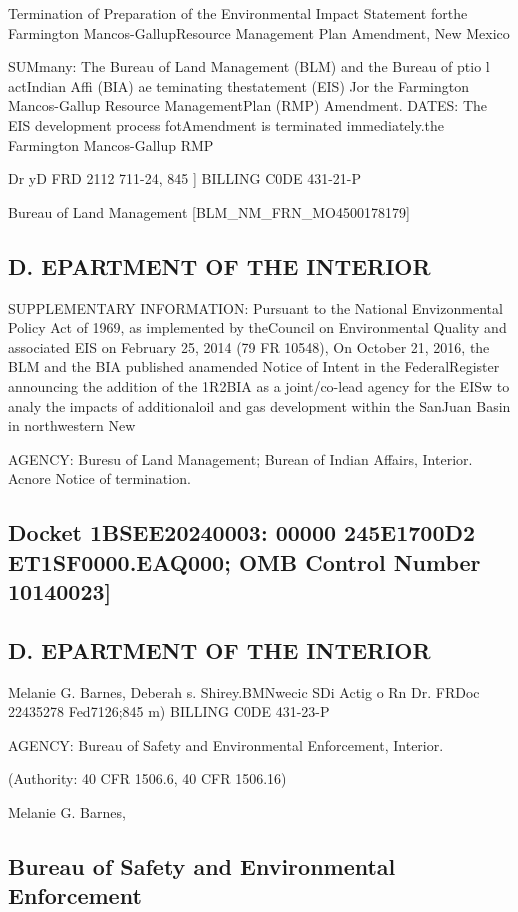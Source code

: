\documentclass{article}
\begin{document}
Termination of Preparation of the
Environmental Impact Statement forthe Farmington Mancos-GallupResource Management Plan
Amendment, New Mexico


SUMmany: The Bureau of Land
Management (BLM) and the Bureau of
ptio l actIndian Affi (BIA) ae teminating thestatement (EIS) Jor the Farmington
Mancos-Gallup Resource ManagementPlan (RMP) Amendment.
DATES: The EIS development process fotAmendment is terminated immediately.the Farmington Mancos-Gallup RMP


Dr yD 
FRD 2112 711-24, 845 ]
BILLING C0DE 431-21-P


Bureau of Land Management
[BLM\_NM\_FRN\_MO4500178179]


\subsection*{D. EPARTMENT OF THE INTERIOR}


SUPPLEMENTARY INFORMATION: Pursuant
to the National Envizonmental Policy
Act of 1969, as implemented by theCouncil on Environmental Quality
and associated EIS on February 25, 2014
(79 FR 10548), On October 21, 2016, the
BLM and the BIA published anamended Notice of Intent in the FederalRegister announcing the addition of the
1R2BIA as a joint/co-lead agency for the EISw to analy the impacts of additionaloil and gas development within the SanJuan Basin in northwestern New


AGENCY: Buresu of Land Management;
Burean of Indian Affairs, Interior.
Acnore Notice of termination.


\subsection*{Docket 1BSEE20240003: 00000
245E1700D2 ET1SF0000.EAQ000; OMB
Control Number 10140023]}


\subsection*{D. EPARTMENT OF THE INTERIOR}


Melanie G. Barnes,
Deberah s. Shirey.BMNwecic SDi
Actig o Rn Dr.
FRDoc 22435278 Fed7126;845 m)
BILLING C0DE 431-23-P


AGENCY: Bureau of Safety and
Environmental Enforcement, Interior.


(Authority: 40 CFR 1506.6, 40 CFR 1506.16)


Melanie G. Barnes,


\subsection*{Bureau of Safety and Environmental
Enforcement}
\end{document}

